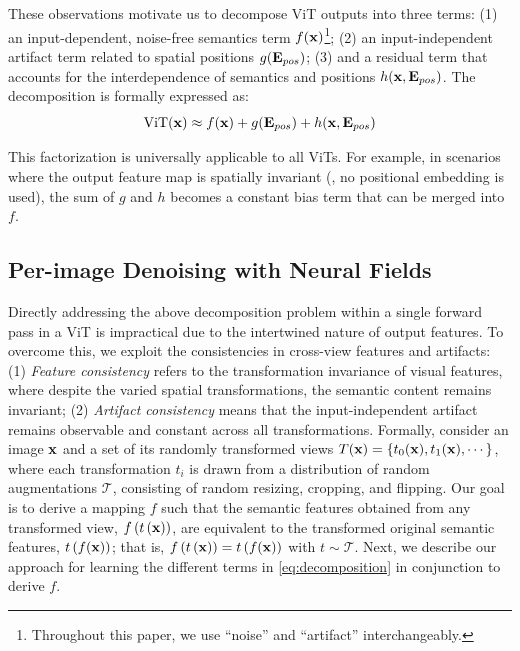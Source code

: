 \documentclass[runningheads]{llncs}
\begin{document}
These observations motivate us to decompose ViT outputs into three terms: (1) an input-dependent, noise-free semantics term $f(\vb{x})$\footnote{Throughout this paper, we use ``noise'' and ``artifact'' interchangeably.}; (2) an input-independent artifact term related to spatial positions $g(\vb{E}_{pos})$; (3) and a residual term that accounts for the interdependence of semantics and positions  $h(\vb{x}, \vb{E}_{pos})$. The decomposition is formally expressed as:
\begin{equation}
    \mathrm{ViT}(\vb{x}) \approx f(\vb{x}) + g(\vb{E}_{pos}) + h(\vb{x}, \vb{E}_{pos}) \label{eq:decomposition}
\end{equation}

This factorization is universally applicable to all ViTs. For example, in scenarios where the output feature map is spatially invariant (\eg, no positional embedding is used), the sum of $g$ and $h$ becomes a constant bias term that can be merged into $f$.


\subsection{Per-image Denoising with Neural Fields}
\label{sec:per_img_denoising}
Directly addressing the above decomposition problem within a single forward pass in a ViT is impractical due to the intertwined nature of output features. To overcome this, we exploit the consistencies in cross-view features and artifacts: (1) \textit{Feature consistency} refers to the transformation invariance of visual features, where despite the varied spatial transformations, the semantic content remains invariant; (2) \textit{Artifact consistency} means that the input-independent artifact remains observable and constant across all transformations. Formally, consider an image $\vb{x}$ and a set of its randomly transformed views $T(\vb{x})=\{t_0(\vb{x}), t_1(\vb{x}), \cdots\}$, where each transformation $t_{i}$ is drawn from a distribution of random augmentations $\mathcal{T}$, consisting of random resizing, cropping, and flipping. Our goal is to derive a mapping $f$ such that the semantic features obtained from any transformed view, $f\left(t\left(\vb{x}\right)\right)$, are equivalent to the transformed original semantic features, $t\left(f(\vb{x})\right)$; that is, $f\left(t\left(\vb{x}\right)\right)=t\left(f(\vb{x})\right)$ with $t \sim \mathcal{T}$. Next, we describe our approach for learning the different terms in \cref{eq:decomposition} in conjunction to derive $f$.
\end{document}
